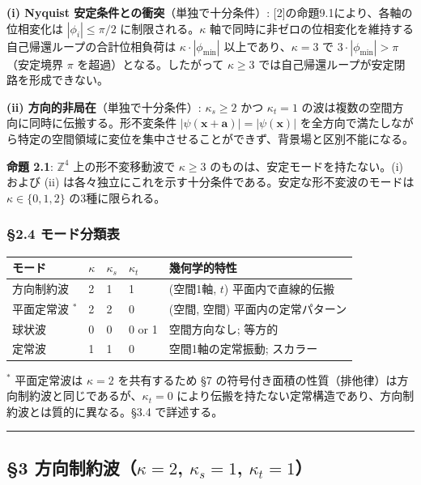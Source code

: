 \documentclass[
  a4paper,11pt]{ltjsarticle}
\newcounter{none}
\theoremstyle{definition}
\theoremstyle{remark}
\begin{document}
\textbf{(i) Nyquist 安定条件との衝突}（単独で十分条件）:
{[}2{]}の命題9.1により、各軸の位相変化は \(|\phi_i| \leq \pi/2\)
に制限される。\(\kappa\)
軸で同時に非ゼロの位相変化を維持する自己帰還ループの合計位相負荷は
\(\kappa \cdot |\phi_{\min}|\) 以上であり、\(\kappa = 3\) で
\(3 \cdot |\phi_{\min}| > \pi\)（安定境界 \(\pi\)
を超過）となる。したがって \(\kappa \geq 3\)
では自己帰還ループが安定閉路を形成できない。

\textbf{(ii) 方向的非局在}（単独で十分条件）: \(\kappa_s \geq 2\) かつ
\(\kappa_t = 1\) の波は複数の空間方向に同時に伝搬する。形不変条件
\(|\psi(\mathbf{x} + \mathbf{a})| = |\psi(\mathbf{x})|\)
を全方向で満たしながら特定の空間領域に変位を集中させることができず、背景場と区別不能になる。

\textbf{命題 2.1}: \(\mathbb{Z}^4\) 上の形不変移動波で \(\kappa \geq 3\)
のものは、安定モードを持たない。(i) および (ii)
は各々独立にこれを示す十分条件である。安定な形不変波のモードは
\(\kappa \in \{0, 1, 2\}\) の3種に限られる。

\subsubsection{§2.4
モード分類表}\label{ux30e2ux30fcux30c9ux5206ux985eux8868}

{\def\LTcaptype{none} %
\begin{longtable}[]{@{}lllll@{}}
\toprule\noalign{}
モード & \(\kappa\) & \(\kappa_s\) & \(\kappa_t\) & 幾何学的特性 \\
\midrule\noalign{}
\endhead
\bottomrule\noalign{}
\endlastfoot
方向制約波 & 2 & 1 & 1 & (空間1軸, \(t\)) 平面内で直線的伝搬 \\
平面定常波 \({}^{*}\) & 2 & 2 & 0 & (空間, 空間) 平面内の定常パターン \\
球状波 & 0 & 0 & 0 or 1 & 空間方向なし; 等方的 \\
定常波 & 1 & 1 & 0 & 空間1軸の定常振動; スカラー \\
\end{longtable}
}

\({}^{*}\) 平面定常波は \(\kappa = 2\) を共有するため §7
の符号付き面積の性質（排他律）は方向制約波と同じであるが、\(\kappa_t = 0\)
により伝搬を持たない定常構造であり、方向制約波とは質的に異なる。§3.4
で詳述する。

\begin{center}\rule{0.5\linewidth}{0.5pt}\end{center}

\subsection{\texorpdfstring{§3 方向制約波（\(\kappa = 2\),
\(\kappa_s = 1\),
\(\kappa_t = 1\)）}{§3 方向制約波（\textbackslash kappa = 2, \textbackslash kappa\_s = 1, \textbackslash kappa\_t = 1）}}\label{ux65b9ux5411ux5236ux7d04ux6ce2kappa-2-kappa_s-1-kappa_t-1}
\end{document}
